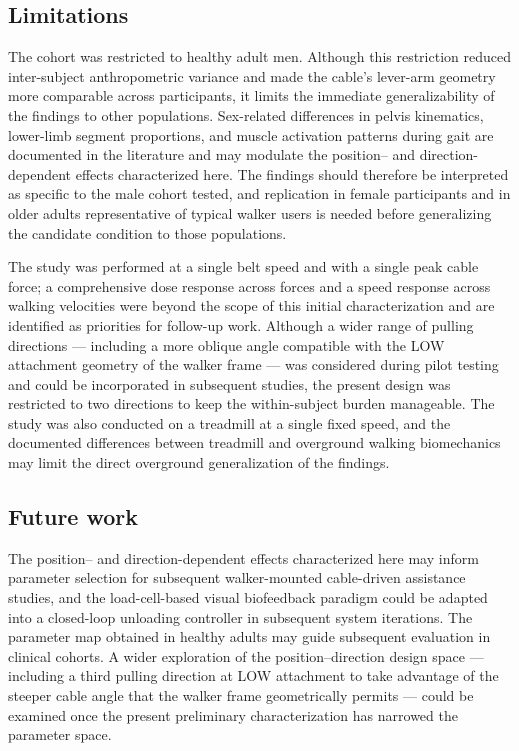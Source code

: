 \documentclass[11pt,a4paper]{article}
\begin{document}
\subsection*{Limitations}
The cohort was restricted to healthy adult men. Although this restriction reduced inter-subject anthropometric variance and made the cable's lever-arm geometry more comparable across participants, it limits the immediate generalizability of the findings to other populations. Sex-related differences in pelvis kinematics, lower-limb segment proportions, and muscle activation patterns during gait are documented in the literature and may modulate the position-- and direction-dependent effects characterized here. The findings should therefore be interpreted as specific to the male cohort tested, and replication in female participants and in older adults representative of typical walker users is needed before generalizing the candidate condition to those populations.

The study was performed at a single belt speed and with a single peak cable force; a comprehensive dose response across forces and a speed response across walking velocities were beyond the scope of this initial characterization and are identified as priorities for follow-up work. Although a wider range of pulling directions — including a more oblique angle compatible with the LOW attachment geometry of the walker frame — was considered during pilot testing and could be incorporated in subsequent studies, the present design was restricted to two directions to keep the within-subject burden manageable. The study was also conducted on a treadmill at a single fixed speed, and the documented differences between treadmill and overground walking biomechanics may limit the direct overground generalization of the findings.

\subsection*{Future work}
The position-- and direction-dependent effects characterized here may inform parameter selection for subsequent walker-mounted cable-driven assistance studies, and the load-cell-based visual biofeedback paradigm could be adapted into a closed-loop unloading controller in subsequent system iterations. The parameter map obtained in healthy adults may guide subsequent evaluation in clinical cohorts. A wider exploration of the position--direction design space — including a third pulling direction at LOW attachment to take advantage of the steeper cable angle that the walker frame geometrically permits — could be examined once the present preliminary characterization has narrowed the parameter space.
\end{document}

